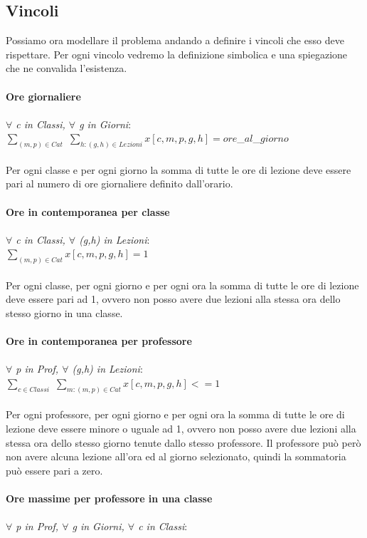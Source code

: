 \documentclass{article}
\begin{document}
\subsection{Vincoli}
Possiamo ora modellare il problema andando a definire i vincoli che esso deve rispettare. Per ogni vincolo vedremo la definizione simbolica e una spiegazione che ne convalida l'esistenza.
\\\\\textbf{Ore giornaliere}
	\\\\\emph{$\forall$ c in Classi, $\forall$ g in Giorni}: 
	\\$\sum_{(m,p) \in Cat}$ $\sum_{h :(g,h)\in Lezioni}x[c,m,p,g,h] = ore$\_$al$\_$giorno$
\\\\Per ogni classe e per ogni giorno la somma di tutte le ore di lezione deve essere pari al numero di ore giornaliere definito dall'orario.
\\\\\textbf{Ore in contemporanea per classe}
	\\\\\emph{$\forall$ c in Classi, $\forall$ (g,h)  in Lezioni}: 
	\\$\sum_{(m,p) \in Cat}x[c,m,p,g,h] = 1$
\\\\Per ogni classe, per ogni giorno e per ogni ora la somma di tutte le ore di lezione deve essere pari ad 1, ovvero non posso avere due lezioni alla stessa ora dello stesso giorno in una classe.
\\\\\textbf{Ore in contemporanea per professore}
	\\\\\emph{$\forall$ p in Prof, $\forall$ (g,h) in Lezioni}: 
	\\$\sum_{c \in Classi}$ $\sum_{m : (m,p) \in Cat}x[c,m,p,g,h] <= 1$
\\\\Per ogni professore, per ogni giorno e per ogni ora la somma di tutte le ore di lezione deve essere minore o uguale ad 1, ovvero non posso avere due lezioni alla stessa ora dello stesso giorno tenute dallo stesso professore. Il professore può però non avere alcuna lezione all'ora ed al giorno selezionato, quindi la sommatoria può essere pari a zero.
\\\\\textbf{Ore massime per professore in una classe}
	\\\\\emph{$\forall$ p in Prof, $\forall$ g in Giorni, $\forall$ c in Classi}:
\end{document}
